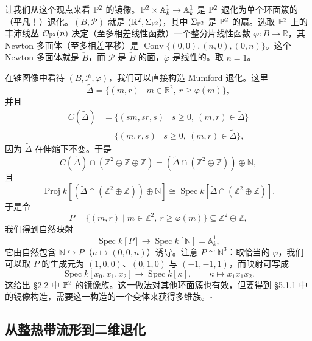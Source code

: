 \begin{example}
让我们从这个观点来看 $\mathbb{P}^2$ 的镜像。$\mathbb{P}^2\times\mathbb{A}^1_k\to\mathbb{A}^1_k$ 是 $\mathbb{P}^2$ 退化为单个环面簇的（平凡！）退化。$(B,\mathcal{P})$ 就是 $(\mathbb{R}^2,\Sigma_{\mathbb{P}^2})$，其中 $\Sigma_{\mathbb{P}^2}$ 是 $\mathbb{P}^2$ 的扇。选取 $\mathbb{P}^2$ 上的丰沛线丛 $\mathcal{O}_{\mathbb{P}^2}(n)$ 决定（至多相差线性函数）一个整分片线性函数 $\varphi:B\to\mathbb{R}$，其 Newton 多面体（至多相差平移）是 $\operatorname{Conv}\{(0,0),(n,0),(0,n)\}$。这个 Newton 多面体就是 $\check B$，而 $\check{\mathcal{P}}$ 是 $\check B$ 的面，$\check\varphi$ 是线性的。取 $n=1$。

在锥图像中看待 $(B,\mathcal{P},\varphi)$，我们可以直接构造 Mumford 退化。这里
\[
  \tilde\Delta=\{(m,r)\mid m\in\mathbb{R}^2,\ r\ge\varphi(m)\},
\]
并且
\begin{align*}
  C(\tilde\Delta)&=\{(sm,sr,s)\mid s\ge0,\ (m,r)\in\tilde\Delta\}\\
  &=\{(m,r,s)\mid s\ge0,\ (m,r)\in\tilde\Delta\},
\end{align*}
因为 $\tilde\Delta$ 在伸缩下不变。于是
\[
  C(\tilde\Delta)\cap(\mathbb{Z}^2\oplus\mathbb{Z}\oplus\mathbb{Z})=(\tilde\Delta\cap(\mathbb{Z}^2\oplus\mathbb{Z}))\oplus\mathbb{N},
\]
且
\[
  \operatorname{Proj}k[(\tilde\Delta\cap(\mathbb{Z}^2\oplus\mathbb{Z}))\oplus\mathbb{N}]
  \cong\operatorname{Spec}k[\tilde\Delta\cap(\mathbb{Z}^2\oplus\mathbb{Z})].
\]
于是令
\[
  P=\{(m,r)\mid m\in\mathbb{Z}^2,\ r\ge\varphi(m)\}\subseteq\mathbb{Z}^2\oplus\mathbb{Z},
\]
我们得到自然映射
\[
  \operatorname{Spec} k[P]\to\operatorname{Spec} k[\mathbb{N}]=\mathbb{A}^1_k,
\]
它由自然包含 $\mathbb{N}\hookrightarrow P$（$n\mapsto(0,0,n)$）诱导。注意 $P\cong\mathbb{N}^3$：取恰当的 $\varphi$，我们可以取 $P$ 的生成元为 $(1,0,0)$、$(0,1,0)$ 与 $(-1,-1,1)$，而映射可写成
\[
  \operatorname{Spec} k[x_0,x_1,x_2]\to\operatorname{Spec} k[\kappa],\qquad
  \kappa\mapsto x_1x_1x_2.
\]
这给出 §2.2 中 $\mathbb{P}^2$ 的镜像族。这一做法对其他环面簇也有效，但要得到 §5.1.1 中的镜像构造，需要这一构造的一个变体来获得多维族。\hfill$\square$
\end{example}


\subsection{从整热带流形到二维退化}

